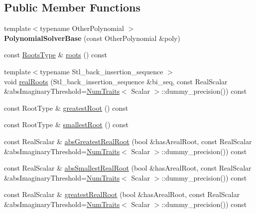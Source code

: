 \subsection*{Public Member Functions}
\begin{DoxyCompactItemize}
\item 
\mbox{\label{class_eigen_1_1_polynomial_solver_base_a117e0c16d65aa7e670b793e271d13cc4}} 
{\footnotesize template$<$typename Other\+Polynomial $>$ }\\{\bfseries Polynomial\+Solver\+Base} (const Other\+Polynomial \&poly)
\item 
const \hyperlink{group___core___module}{Roots\+Type} \& \hyperlink{class_eigen_1_1_polynomial_solver_base_a07bcd5339be5eacdf7e566d07d81bedb}{roots} () const
\item 
{\footnotesize template$<$typename Stl\+\_\+back\+\_\+insertion\+\_\+sequence $>$ }\\void \hyperlink{class_eigen_1_1_polynomial_solver_base_a4ea3b29499623832a0ad7b2b3ab05597}{real\+Roots} (Stl\+\_\+back\+\_\+insertion\+\_\+sequence \&bi\+\_\+seq, const Real\+Scalar \&abs\+Imaginary\+Threshold=\hyperlink{group___core___module_struct_eigen_1_1_num_traits}{Num\+Traits}$<$ Scalar $>$\+::dummy\+\_\+precision()) const
\item 
const Root\+Type \& \hyperlink{class_eigen_1_1_polynomial_solver_base_a0327769cc88877a79c7c838f03d78384}{greatest\+Root} () const
\item 
const Root\+Type \& \hyperlink{class_eigen_1_1_polynomial_solver_base_a64389d0acf586c772fb3d1db47a3f7ef}{smallest\+Root} () const
\item 
const Real\+Scalar \& \hyperlink{class_eigen_1_1_polynomial_solver_base_aa2f003d9662af8c776f1a1c12a9d4210}{abs\+Greatest\+Real\+Root} (bool \&has\+Areal\+Root, const Real\+Scalar \&abs\+Imaginary\+Threshold=\hyperlink{group___core___module_struct_eigen_1_1_num_traits}{Num\+Traits}$<$ Scalar $>$\+::dummy\+\_\+precision()) const
\item 
const Real\+Scalar \& \hyperlink{class_eigen_1_1_polynomial_solver_base_a9316eeb24076bcd4f60ea4d7f3e549eb}{abs\+Smallest\+Real\+Root} (bool \&has\+Areal\+Root, const Real\+Scalar \&abs\+Imaginary\+Threshold=\hyperlink{group___core___module_struct_eigen_1_1_num_traits}{Num\+Traits}$<$ Scalar $>$\+::dummy\+\_\+precision()) const
\item 
const Real\+Scalar \& \hyperlink{class_eigen_1_1_polynomial_solver_base_a5094b7ccc49918b7c7ae9e2a8c49d4bd}{greatest\+Real\+Root} (bool \&has\+Areal\+Root, const Real\+Scalar \&abs\+Imaginary\+Threshold=\hyperlink{group___core___module_struct_eigen_1_1_num_traits}{Num\+Traits}$<$ Scalar $>$\+::dummy\+\_\+precision()) const

\end{DoxyCompactItemize}
